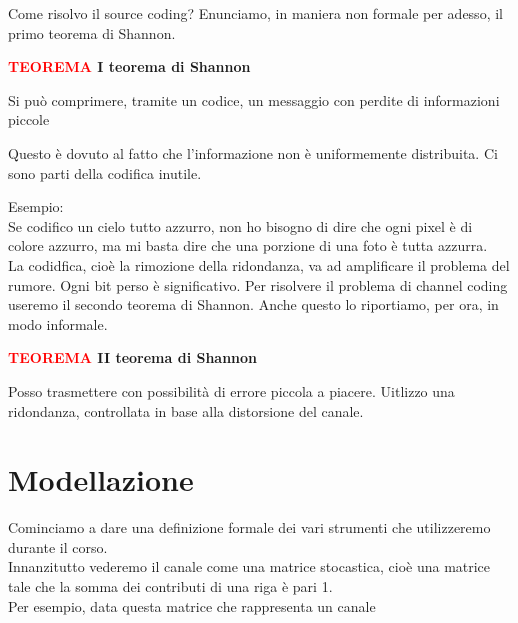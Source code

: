 \documentclass{article}
\begin{document}
    \vspace{10px}

    \noindent Come risolvo il source coding? Enunciamo, in maniera non formale per adesso, il primo teorema di Shannon.
    \vspace{5px}
    \begin{tcolorbox}
        \textbf{\textcolor{red}{TEOREMA} I teorema di Shannon}
        \vspace{5px}
        \begin{center}
            Si può comprimere, tramite un codice, un messaggio con perdite di informazioni piccole
        \end{center}
    \end{tcolorbox}
    \vspace{5px}
    \noindent Questo è dovuto al fatto che l'informazione non è uniformemente distribuita. Ci sono parti della codifica inutile.\\
    \vspace{5px}

    \noindent Esempio:\\
    Se codifico un cielo tutto azzurro, non ho bisogno di dire che ogni pixel è di colore azzurro, ma mi basta dire che una porzione di una foto è tutta azzurra.
    \\
    La codidfica, cioè la rimozione della ridondanza, va ad amplificare il problema del rumore. Ogni bit perso è significativo. Per risolvere il problema di channel coding useremo il secondo teorema di Shannon. Anche questo lo riportiamo, per ora, in modo informale.

    \vspace{5px}
    \begin{tcolorbox}
        \textbf{\textcolor{red}{TEOREMA} II teorema di Shannon}
        \vspace{5px}
        \begin{center}
            Posso trasmettere con possibilità di errore piccola a piacere. Uitlizzo una ridondanza, controllata in base alla distorsione del canale.
        \end{center}
    \end{tcolorbox}

    \section{Modellazione}
    Cominciamo a dare una definizione formale dei vari strumenti che utilizzeremo durante il corso.\\
    Innanzitutto vederemo il canale come una matrice stocastica, cioè una matrice tale che la somma dei contributi di una riga è pari 1.\\
    Per esempio, data questa matrice che rappresenta un canale
\end{document}
